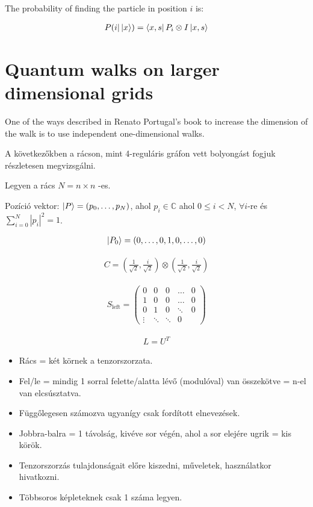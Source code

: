 The probability of finding the particle in position $i$ is:

\begin{align}
    P(i | \ket{x}) = \bra{x,s}P_i\otimes{}I\ket{x,s}
\end{align}

\section{Quantum walks on larger dimensional grids}

One of the ways described in Renato Portugal's book to increase the dimension of the walk is to use independent one-dimensional walks.


A következőkben a rácson, mint 4-reguláris gráfon vett bolyongást fogjuk
részletesen megvizsgálni.

Legyen a rács $N = n \times n$ -es.

Pozíció vektor: $\ket{P} =  (p_{0}, \dots, p_{N})$, ahol
$p_{i}\in\mathds{C}$ ahol $0 \leq{} i < N$, $\forall{}i$-re és $\sum\limits_{i=0}^{N} |p_i|^2 = 1$.

\begin{align}
  \ket{P_{0}} =  (0, \dots, 0, 1, 0, \dots, 0)
\end{align}

\begin{align}
  C = (\frac{1}{\sqrt{2}}, \frac{i}{\sqrt{2}}) \otimes (\frac{1}{\sqrt{2}}, \frac{i}{\sqrt{2}})
\end{align}

\begin{align}
  S_{\text{left}} =
  \begin{pmatrix}
    0      & 0      & 0      & \dots  & 0 \\
    1      & 0      & 0      & \dots  & 0 \\
    0      & 1      & 0      & \ddots & 0 \\
    \vdots & \ddots & \ddots & 0
  \end{pmatrix}
\end{align}


\begin{align}
  L = U^{T}
\end{align}


\begin{itemize}
  \item Rács = két körnek a tenzorszorzata.
  \item Fel/le = mindig 1 sorral felette/alatta lévő (modulóval) van összekötve = n-el van elcsúsztatva.
  \item Függőlegesen számozva ugyanígy csak fordított elnevezések.
  \item Jobbra-balra = 1 távolság, kivéve sor végén, ahol a sor elejére ugrik = kis körök.
  \item Tenzorszorzás tulajdonságait előre kiszedni, műveletek, használatkor hivatkozni.
  \item Többsoros képleteknek csak 1 száma legyen.
\end{itemize}

